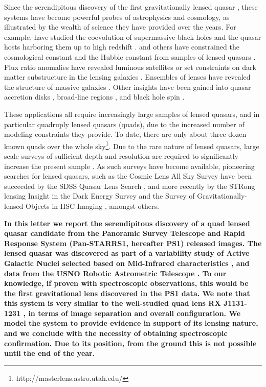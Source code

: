 \documentclass[manuscript]{aastex}
\begin{document}
Since the serendipitous discovery of the first gravitationally lensed quasar \citep{wal79}, these systems have become powerful probes of astrophysics and cosmology, as illustrated by the wealth of science they have provided over the years. For example, \citet{peng06,din17} have studied the coevolution of supermassive black holes and the quasar hosts harboring them up to high redshift \citep{cla02,tre10}. \citet{ogu12,bon17} and others have constrained the cosmological constant and the Hubble constant from samples of lensed quasars \citep[see recent review by][]{Tre16}. Flux ratio anomalies have revealed luminous satellites or set constraints on dark matter substructure in the lensing galaxies \citep[e.g.,][]{chiba05,mck07,fad12}. Ensembles of lenses have revealed the structure of massive galaxies \citep[e.g.,][]{koc00,ogu14}. Other insights have been gained into quasar accretion disks \citep[e.g.,][]{dai10}, broad-line regions \citep[e.g.,][]{slu12}, and black hole spin \citep{reis14}.

These applications all require increasingly large samples of lensed quasars, and in particular quadruply lensed quasars (quads), due to the increased number of modeling constraints they provide. To date, there are only about three dozen known quads over the whole sky\footnote{http://masterlens.astro.utah.edu/}. Due to the rare nature of lensed quasars, large scale surveys of sufficient depth and resolution are required to significantly increase the present sample \citep{ogu10}. As such surveys have become available, pioneering searches for lensed quasars, such as the Cosmic Lens All Sky Survey \citep[CLASS;][]{mye03} have been succeeded by the SDSS Quasar Lens Search \citep[SQLS;][]{ogu06}, and more recently by the STRong lensing Insight in the Dark Energy Survey \citep[STRIDES;][]{agn15} and the Survey of Gravitationally-lensed Objects in HSC Imaging \citep[SuGOHI;][]{son17}, amongst others.

{\bf In this letter we report the serendipitous discovery of a quad lensed quasar candidate from the Panoramic Survey Telescope and Rapid Response System (Pan-STARRS1, hereafter PS1) released images. The lensed quasar was discovered as part of a variability study of Active Galactic Nuclei selected based on Mid-Infrared characteristics \citep{sec01}, and data from the USNO Robotic Astrometric Telescope \citep[URAT;][]{zac15}. To our knowledge, if proven with spectroscopic observations, this would be the first gravitational lens discovered in the PS1 data. We note that this system is very similar to the well-studied quad lens RX J1131-1231 \citep{slu03}, in terms of image separation and overall configuration. We model the system to provide evidence in support of its lensing nature, and we conclude with the necessity of obtaining spectroscopic confirmation. Due to its position, from the ground this is not possible until the end of the year.}
\end{document}
